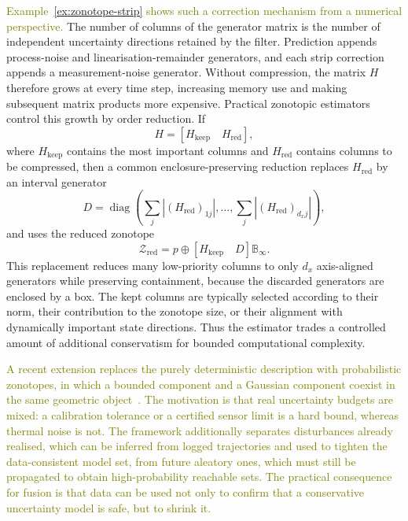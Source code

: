 \textcolor{olive}{Example~\ref{ex:zonotope-strip} shows such a correction mechanism from a numerical perspective.} The number of columns of the generator matrix is the number of independent uncertainty directions retained by the filter. Prediction appends process-noise and linearisation-remainder generators, and each strip correction appends a measurement-noise generator. Without compression, the matrix $H$ therefore grows at every time step, increasing memory use and making subsequent matrix products more expensive. Practical zonotopic estimators control this growth by order reduction. If
\begin{equation}
H=\left[H_{\mathrm{keep}}\quad H_{\mathrm{red}}\right],
\end{equation}
where $H_{\mathrm{keep}}$ contains the most important columns and $H_{\mathrm{red}}$ contains columns to be compressed, then a common enclosure-preserving reduction replaces $H_{\mathrm{red}}$ by an interval generator
\begin{equation}
D=\operatorname{diag}\!\left(\sum_j |(H_{\mathrm{red}})_{1j}|,\ldots,
\sum_j |(H_{\mathrm{red}})_{d_xj}|\right),
\end{equation}
and uses the reduced zonotope
\begin{equation}
\mathcal{Z}_{\mathrm{red}}
=
p\oplus
\left[H_{\mathrm{keep}}\quad D\right]\mathbb{B}_{\infty}.
\end{equation}
This replacement reduces many low-priority columns to only $d_x$ axis-aligned generators while preserving containment, because the discarded generators are enclosed by a box. The kept columns are typically selected according to their norm, their contribution to the zonotope size, or their alignment with dynamically important state directions. Thus the estimator trades a controlled amount of additional conservatism for bounded computational complexity.


\textcolor{olive}{A recent extension replaces the purely deterministic description with probabilistic zonotopes, in which a bounded component and a Gaussian component coexist in the same geometric object~\cite{modares2026reachability}. The motivation is that real uncertainty budgets are mixed: a calibration tolerance or a certified sensor limit is a hard bound, whereas thermal noise is not. The framework additionally separates disturbances already realised, which can be inferred from logged trajectories and used to tighten the data-consistent model set, from future aleatory ones, which must still be propagated to obtain high-probability reachable sets. The practical consequence for fusion is that data can be used not only to confirm that a conservative uncertainty model is safe, but to shrink it.}


